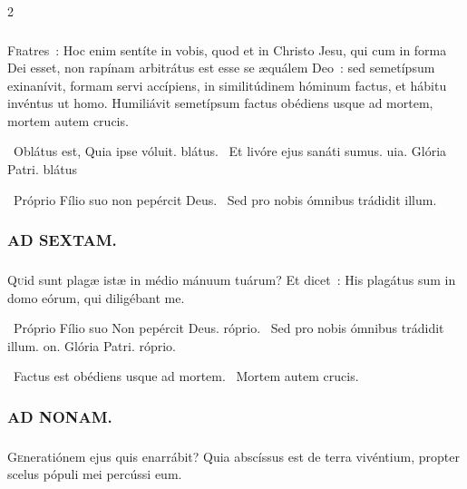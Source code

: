 \documentclass[9pt,twoside]{extarticle}
\begin{document}
\begin{multicols}{2}
{\subsubsection*{}
\lettrine{F}ratres~: Hoc enim sentíte in vobis, quod et in Christo Jesu, qui cum in forma Dei esset, non rapínam arbitrátus est esse se æquálem Deo~: sed semetípsum exinanívit, formam servi accípiens, in similitúdinem hóminum factus, et hábitu invéntus ut homo. Humiliávit semetípsum factus obédiens usque ad mortem, mortem autem crucis.

\begin{tightlist}{}
\item {}~Oblátus est, \textred{*} Quia ipse vóluit. blátus. ~Et livóre ejus sanáti sumus. uia. Glória Patri. blátus 
\item {}~Próprio Fílio suo non pepércit Deus. ~Sed pro nobis ómnibus trádidit illum.
\end{tightlist}

\subsubsection*{\center \textsc{AD SEXTAM.}}
\subsubsection*{}
\lettrine{Q}uid sunt plagæ istæ in médio mánuum tuárum? Et dicet~: His plagátus sum in domo eórum, qui diligébant me.

\begin{tightlist}{}
\item {}~Próprio Fílio suo \textred{*} Non pepércit Deus. róprio. ~Sed pro nobis ómnibus trádidit illum. on. Glória Patri. róprio.
\item {}~Factus est obédiens usque ad mortem. ~Mortem autem crucis.
\end{tightlist}

\subsubsection*{\center \textsc{AD NONAM.}}
\subsubsection*{}
\lettrine{G}eneratiónem ejus quis enarrábit? Quia abscíssus est de terra vivéntium, propter scelus pópuli mei percússi eum.

}
\end{multicols}
\end{document}
